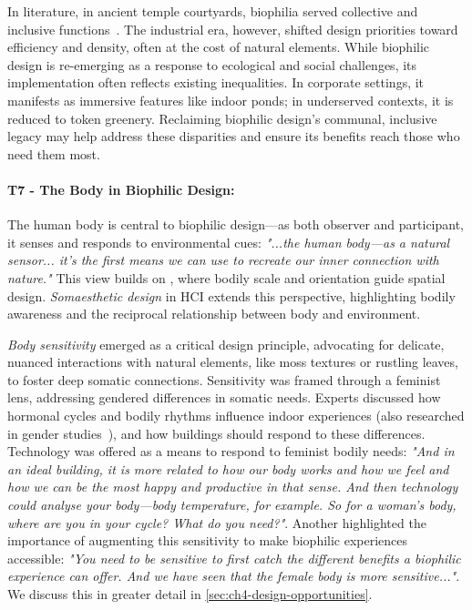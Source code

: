 In literature, in ancient temple courtyards, biophilia served collective and inclusive functions~\cite{gurung2015expanding}. The industrial era, however, shifted design priorities toward efficiency and density, often at the cost of natural elements. While biophilic design is re-emerging as a response to ecological and social challenges, its implementation often reflects existing inequalities. In corporate settings, it manifests as immersive features like indoor ponds; in underserved contexts, it is reduced to token greenery. Reclaiming biophilic design’s communal, inclusive legacy may help address these disparities and ensure its benefits reach those who need them most.


\paragraph{T7 - The Body in Biophilic Design:}
\label{theme:t7}

The human body is central to biophilic design---as both observer and participant, it senses and responds to environmental cues: \textit{"...the human body—as a natural sensor... it’s the first means we can use to recreate our inner connection with nature."} This view builds on \citet{shusterman2011somaesthetics}, where bodily scale and orientation guide spatial design. \emph{Somaesthetic design} in HCI extends this perspective, highlighting bodily awareness and the reciprocal relationship between body and environment\cite{hook2008knowing, hook2018designing}.

\emph{Body sensitivity} emerged as a critical design principle, advocating for delicate, nuanced interactions with natural elements, like moss textures or rustling leaves, to foster deep somatic connections. Sensitivity was framed through a feminist lens, addressing gendered differences in somatic needs. Experts discussed how hormonal cycles and bodily rhythms influence indoor experiences (also researched in gender studies~\cite{haselsteiner2021gender, kim2013gender}), and how buildings should respond to these differences. Technology was offered as a means to respond to feminist bodily needs: \textit{"And in an ideal building, it is more related to how our body works and how we feel and how we can be the most happy and productive in that sense. And then technology could analyse your body---body temperature, for example. So for a woman’s body, where are you in your cycle? What do you need?"}. Another highlighted the importance of augmenting this sensitivity to make biophilic experiences accessible: \textit{"You need to be sensitive to first catch the different benefits a biophilic experience can offer. And we have seen that the female body is more sensitive..."}. We discuss this in greater detail in \autoref{sec:ch4-design-opportunities}.

